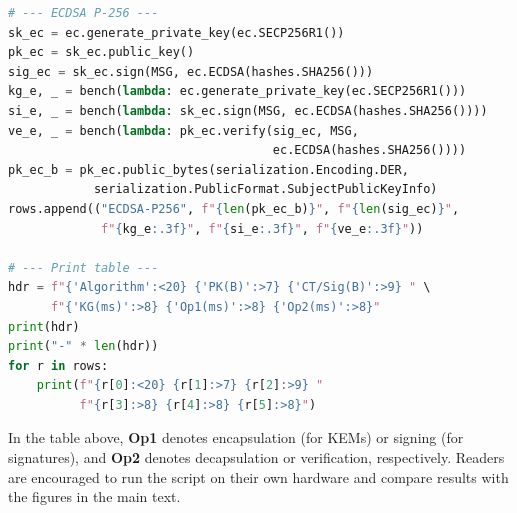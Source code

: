 \begin{lstlisting}[language=Python,caption={Comprehensive PQC benchmark script}]
# --- ECDSA P-256 ---
sk_ec = ec.generate_private_key(ec.SECP256R1())
pk_ec = sk_ec.public_key()
sig_ec = sk_ec.sign(MSG, ec.ECDSA(hashes.SHA256()))
kg_e, _ = bench(lambda: ec.generate_private_key(ec.SECP256R1()))
si_e, _ = bench(lambda: sk_ec.sign(MSG, ec.ECDSA(hashes.SHA256())))
ve_e, _ = bench(lambda: pk_ec.verify(sig_ec, MSG,
                                     ec.ECDSA(hashes.SHA256())))
pk_ec_b = pk_ec.public_bytes(serialization.Encoding.DER,
            serialization.PublicFormat.SubjectPublicKeyInfo)
rows.append(("ECDSA-P256", f"{len(pk_ec_b)}", f"{len(sig_ec)}",
             f"{kg_e:.3f}", f"{si_e:.3f}", f"{ve_e:.3f}"))

# --- Print table ---
hdr = f"{'Algorithm':<20} {'PK(B)':>7} {'CT/Sig(B)':>9} " \
      f"{'KG(ms)':>8} {'Op1(ms)':>8} {'Op2(ms)':>8}"
print(hdr)
print("-" * len(hdr))
for r in rows:
    print(f"{r[0]:<20} {r[1]:>7} {r[2]:>9} "
          f"{r[3]:>8} {r[4]:>8} {r[5]:>8}")
\end{lstlisting}

\noindent In the table above, \textbf{Op1} denotes encapsulation (for KEMs)
or signing (for signatures), and \textbf{Op2} denotes decapsulation or
verification, respectively. Readers are encouraged to run the script on
their own hardware and compare results with the figures in the main text.
